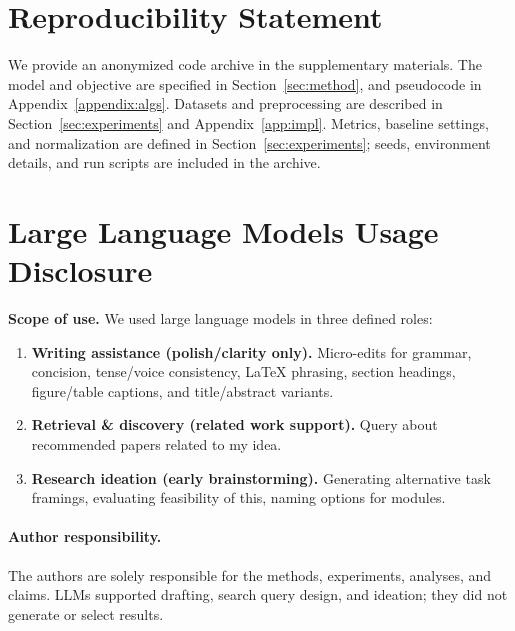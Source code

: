 \documentclass{article} %
\begin{document}
\section*{Reproducibility Statement}
\label{app:repro}

We provide an anonymized code archive in the supplementary materials. The model and objective are specified in Section~\ref{sec:method}, and pseudocode in Appendix~\ref{appendix:algs}. Datasets and preprocessing are described in Section~\ref{sec:experiments} and Appendix~\ref{app:impl}. Metrics, baseline settings, and normalization are defined in Section~\ref{sec:experiments}; seeds, environment details, and run scripts are included in the archive.





\clearpage
\appendix


\localtableofcontents
\bigskip


\newpage

\section{Large Language Models Usage Disclosure}
\label{app:llm-usage}

\textbf{Scope of use.}
We used large language models in three defined roles:
\begin{enumerate}[leftmargin=1.25em,itemsep=2pt,topsep=2pt]
\item \textbf{Writing assistance (polish/clarity only).}
  Micro-edits for grammar, concision, tense/voice consistency, LaTeX phrasing, section headings, figure/table captions, and title/abstract variants.
\item \textbf{Retrieval \& discovery (related work support).}
  Query about recommended papers related to my idea.
\item \textbf{Research ideation (early brainstorming).}
  Generating alternative task framings, evaluating feasibility of this, naming options for modules.
\end{enumerate}
\paragraph{Author responsibility.}
The authors are solely responsible for the methods, experiments, analyses, and claims. LLMs supported drafting, search query design, and ideation; they did not generate or select results.
\end{document}
